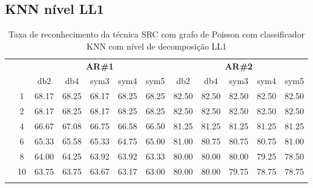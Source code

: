 \begin{table}[H]
\begin{tabular}{|c|c|c c c c c|c c c c c|}
\\\midrule
	\end{tabular}
\end{table}




\subsection{KNN nível LL1}
\begin{table}[H]
	\centering
    \normalsize
	\caption{Taxa de reconhecimento da técnica SRC com grafo de Poisson com classificador KNN com nível de decomposição LL1}
	\begin{tabular}{|c|c|c c c c c|c c c c c|}
\cline{3-12}
\multicolumn{2}{c|}{\multirow{2}{*}{}} & \multicolumn{5}{c|}{\textbf{AR\#1}}  & \multicolumn{5}{c|}{\textbf{AR\#2}} \\\cline{3-12}

\multicolumn{2}{c|}{}  & db2 & db4 & sym3 & sym4 & sym5 & db2 & db4& sym3 & sym4 & sym5 \\\hline

\multicolumn{1}{|c|}{ \multirow{5}{*}{\rotatebox[origin=c]{90}{\textbf{K-vizinhos}}} }
&1	&68.17	&68.25	&68.17	&68.25	&68.25	&82.50	&82.50	&82.50	&82.50	&82.50\\\cline{2-12}
&2	&68.17	&68.25	&68.17	&68.25	&68.25	&82.50	&82.50	&82.50	&82.50	&82.50\\\cline{2-12}
&4	&66.67	&67.08	&66.75	&66.58	&66.50	&81.25	&81.25	&81.25	&81.25	&81.25\\\cline{2-12}
&6	&65.33	&65.58	&65.33	&64.75	&65.00	&81.00	&80.75	&80.75	&80.75	&81.00\\\cline{2-12}
&8	&64.00	&64.25	&63.92	&63.92	&63.33	&80.00	&80.00	&80.00	&79.25	&78.50\\\cline{2-12}
&10	&63.75	&63.75	&63.67	&63.17	&63.00	&80.00	&80.00	&79.75	&78.75	&78.75%


\\ \midrule
\multicolumn{12}{c}{}\\ 





\end{tabular}
\end{table}
